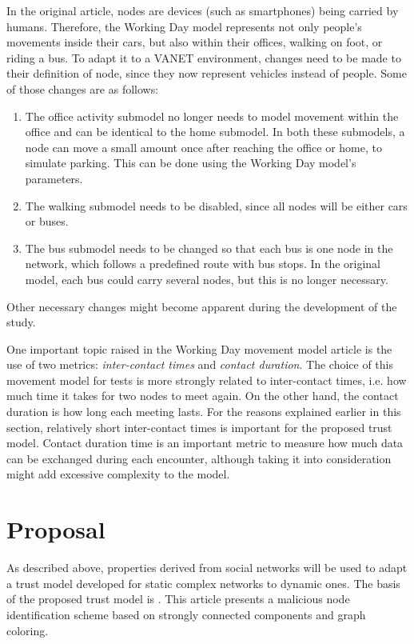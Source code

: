 \documentclass{article}
\begin{document}
In the original article, nodes are devices (such as smartphones) being carried by humans.
Therefore, the Working Day model represents not only people's movements inside their cars, but also within their offices, walking on foot, or riding a bus.
To adapt it to a VANET environment, changes need to be made to their definition of node, since they now represent vehicles instead of people. Some of those changes are as follows:
\begin{enumerate}
\item
The office activity submodel no longer needs to model movement within the office and can be identical to the home submodel.
In both these submodels, a node can move a small amount once after reaching the office or home, to simulate parking.
This can be done using the Working Day model's parameters.
\item
The walking submodel needs to be disabled, since all nodes will be either cars or buses.
\item
The bus submodel needs to be changed so that each bus is one node in the network, which follows a predefined route with bus stops.
In the original model, each bus could carry several nodes, but this is no longer necessary.
\end{enumerate}
Other necessary changes might become apparent during the development of the study.

One important topic raised in the Working Day movement model article is the use of two metrics: \textit{inter-contact times} and \textit{contact duration}.
The choice of this movement model for tests is more strongly related to inter-contact times, i.e. how much time it takes for two nodes to meet again.
On the other hand, the contact duration is how long each meeting lasts.
For the reasons explained earlier in this section, relatively short inter-contact times is important for the proposed trust model.
Contact duration time is an important metric to measure how much data can be exchanged during each encounter, although taking it into consideration might add excessive complexity to the model.

\section{Proposal}

As described above, properties derived from social networks will be used to adapt a trust model developed for static complex networks to dynamic ones.
The basis of the proposed trust model is \cite{vernize2015malicious}.
This article presents a malicious node identification scheme based on strongly connected components and graph coloring.
\end{document}

